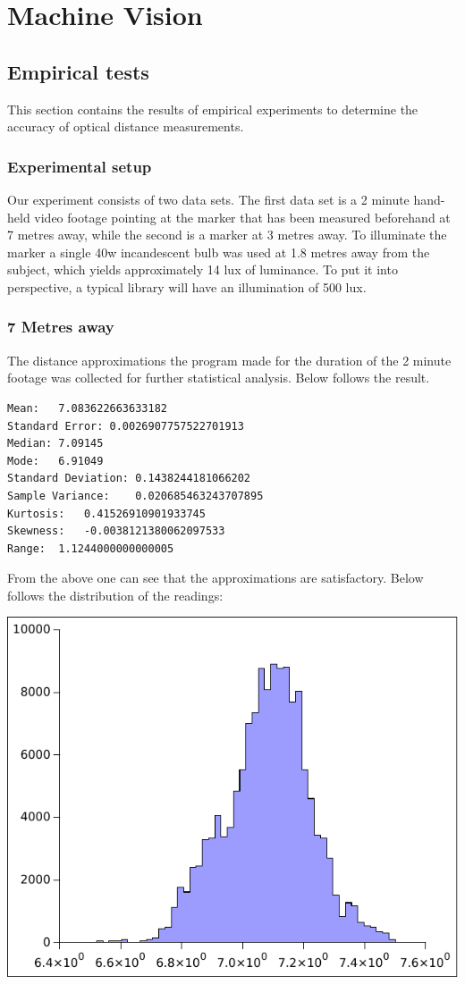 \section{Machine Vision}
\subsection{Empirical tests}
This section contains the results of empirical experiments to determine the accuracy of optical distance measurements.
\subsubsection{Experimental setup}
Our experiment consists of two data sets. The first data set is a 2 minute hand-held video footage pointing at the marker that has been measured beforehand at 7 metres away, while the second is a marker at 3 metres away. To illuminate the marker a single 40w incandescent bulb was used at 1.8 metres away from the subject, which yields approximately 14 lux of luminance. To put it into perspective, a typical library will have an illumination of 500 lux.
\subsubsection{7 Metres away}
The distance approximations the program made for the duration of the 2 minute footage was collected for further statistical analysis. Below follows the result.
\begin{verbatim}
Mean:	7.083622663633182
Standard Error:	0.0026907757522701913
Median:	7.09145
Mode:	6.91049
Standard Deviation:	0.1438244181066202
Sample Variance:	0.020685463243707895
Kurtosis:	0.41526910901933745
Skewness:	-0.0038121380062097533
Range:	1.1244000000000005
\end{verbatim}
From the above one can see that the approximations are satisfactory. Below follows the distribution of the readings:\par
\includegraphics[]{machine_vision/data/7metres.pdf}
